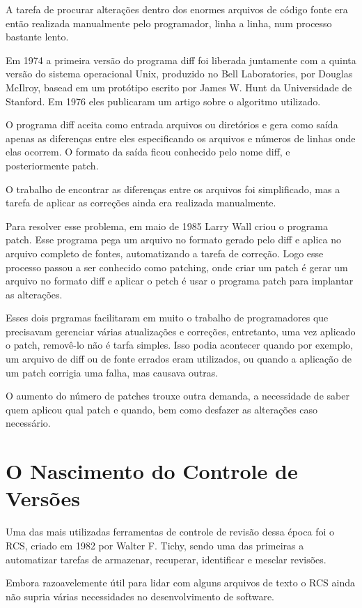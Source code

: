A tarefa de procurar alterações dentro dos enormes arquivos de código fonte
era então realizada manualmente pelo programador, linha a linha, num processo
bastante lento.

Em 1974 a primeira versão do programa diff foi liberada juntamente com a quinta
versão do sistema operacional Unix, produzido no Bell Laboratories, por Douglas
McIlroy, basead em um protótipo escrito por James W. Hunt da Universidade de
Stanford. Em 1976 eles publicaram um artigo sobre o algoritmo utilizado.

O programa diff aceita como entrada arquivos ou diretórios e gera como saída
apenas as diferenças entre eles especificando os arquivos e números de linhas
onde elas ocorrem. O formato da saída ficou conhecido pelo nome diff, e
posteriormente patch.

O trabalho de encontrar as diferenças entre os arquivos foi simplificado, mas
a tarefa de aplicar as correções ainda era realizada manualmente.

Para resolver esse problema, em maio de 1985 Larry Wall criou o programa patch.
Esse programa pega um arquivo no formato gerado pelo diff e aplica no arquivo
completo de fontes, automatizando a tarefa de correção. Logo esse processo
passou a ser conhecido como patching, onde criar um patch é gerar um arquivo
no formato diff e aplicar o petch é usar o programa patch para implantar as
alterações.

Esses dois prgramas facilitaram em muito o trabalho de programadores que
precisavam gerenciar várias atualizações e correções, entretanto, uma vez
aplicado o patch, removê-lo não é tarfa simples. Isso podia acontecer quando
por exemplo, um arquivo de diff ou de fonte errados eram utilizados, ou
quando a aplicação de um patch corrigia uma falha, mas causava outras.

O aumento do número de patches trouxe outra demanda, a necessidade de
saber quem aplicou qual patch e quando, bem como desfazer as alterações
caso necessário.


\section{O Nascimento do Controle de Versões}

Uma das mais utilizadas ferramentas de controle de revisão dessa época
foi o RCS, criado em 1982 por Walter F. Tichy, sendo uma das primeiras
a automatizar tarefas de armazenar, recuperar, identificar e mesclar
revisões.

Embora razoavelemente útil para lidar com alguns arquivos de texto
o RCS ainda não supria várias necessidades no desenvolvimento de software.

